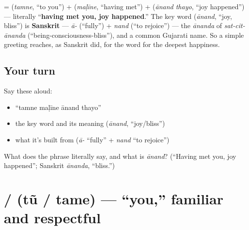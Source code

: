 \begin{cousinweb}
\textbf{   } = \textbf{} (\emph{tamne}, \textquotedblleft{}to you\textquotedblright{}) + \textbf{} (\emph{maḷīne}, \textquotedblleft{}having met\textquotedblright{}) + \textbf{ } (\emph{ānand thayo}, \textquotedblleft{}joy happened\textquotedblright{}) — literally \textquotedblleft{}\textbf{having met you, joy happened}.\textquotedblright{} The key word \textbf{} (\emph{ānand}, \textquotedblleft{}joy, bliss\textquotedblright{}) is \textbf{Sanskrit} — \emph{ā-} (\textquotedblleft{}fully\textquotedblright{}) + \emph{nand} (\textquotedblleft{}to rejoice\textquotedblright{}) — the \emph{ānanda} of \emph{sat-cit-ānanda} (\textquotedblleft{}being-consciousness-bliss\textquotedblright{}), and a common Gujarati name. So a simple greeting reaches, as Sanskrit did, for the word for the deepest happiness.
\end{cousinweb}

\subsection*{Your turn}
Say these aloud:

\begin{itemize}
\raggedright
  \item \textquotedblleft{}tamne maḷīne ānand thayo\textquotedblright{}
  \item the key word and its meaning (\emph{ānand}, \textquotedblleft{}joy/bliss\textquotedblright{})
  \item what it's built from (\emph{ā-} \textquotedblleft{}fully\textquotedblright{} + \emph{nand} \textquotedblleft{}to rejoice\textquotedblright{})
\end{itemize}

\begin{tcolorbox}[breakable,colback=teal!4,colframe=teal!35!black,title={Before you move on}]
What does the phrase literally say, and what is \emph{ānand}? (\textquotedblleft{}Having met you, joy happened\textquotedblright{}; Sanskrit \emph{ānanda}, \textquotedblleft{}bliss.\textquotedblright{})
\end{tcolorbox}
\section[\texorpdfstring{\gu{તું} / \gu{તમે} (tũ / tame)}{તું / તમે (tũ / tame)}]{ /  (tũ / tame) — \textquotedblleft{}you,\textquotedblright{} familiar and respectful}

